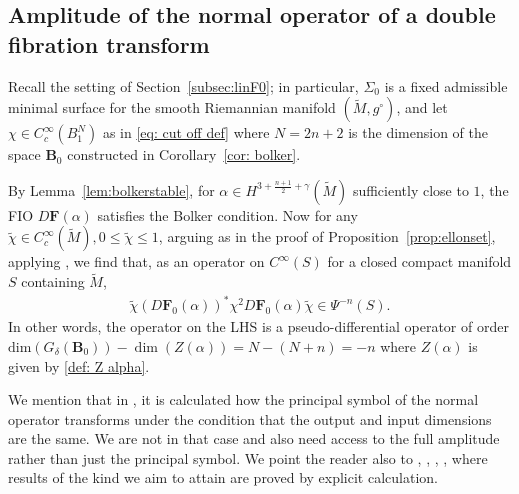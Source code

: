 \documentclass[11pt]{amsart}
\theoremstyle{definition}
\numberwithin{equation}{section}
\newcommand{\BB}{\mathbf B}
\begin{document}
\subsection{Amplitude of the normal operator of a double fibration transform}\label{subsec:amplitude}

Recall the setting of Section~\ref{subsec:linF0}; in particular, $\Sigma_0$ is a fixed admissible minimal surface for the smooth Riemannian manifold $(\widetilde{M},g^\circ)$, and let $\chi\in C^\infty_c(B_1^{N})$ as in \eqref{eq: cut off def} where $N=2n+2$ is the dimension of the space $\BB_0$ constructed in Corollary~\ref{cor: bolker}. 

By Lemma~\ref{lem:bolkerstable}, for $\alpha\in H^{3+\frac{n+1}{2}+\gamma}(\widetilde{M})$ sufficiently close to $1$, the FIO $D\mathbf{F}(\alpha)$ satisfies the Bolker condition. Now for any $\tilde{\chi}\in C_c^\infty(\widetilde{M}), 0\leq \tilde{\chi}\leq 1$, arguing as in the proof of Proposition~\ref{prop:ellonset}, applying \cite[Thm.~1]{MR812288}, we find that, as an operator on $C^\infty(S)$ for a closed compact manifold $S$ containing $\widetilde{M}$,
\begin{eqnarray}\label{eq: order of Q}
\tilde{\chi}(D\mathbf{F}_0(\alpha))^\ast \chi^2 D\mathbf{F}_0(\alpha)\tilde{\chi}\in \Psi^{-n}(S).%
\end{eqnarray}
In other words, the operator on the LHS is a pseudo-differential operator of order $\mathrm{dim} (G_\delta(\BB_0)) - \dim (Z(\alpha)) = N - (N+n) = -n$ where $Z(\alpha)$ is given by \eqref{def: Z alpha}.


We mention that in \cite{zbMATH03738575}, it is calculated how the principal symbol of the normal operator transforms under the condition that the output and input dimensions are the same. We are not in that case and also need access to the full amplitude rather than just the principal symbol. We point the reader also to \cite[Lem.~4]{zbMATH06756133}, \cite{zbMATH02199899}, \cite[Lem.~4.2]{zbMATH05206066}, \cite{zbMATH02103763}, where results of the kind we aim to attain are proved by explicit calculation.%
\end{document}
